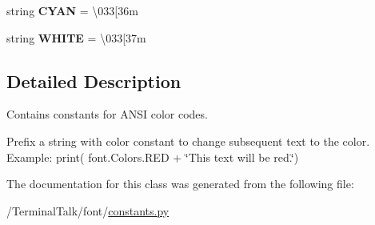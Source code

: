 \begin{DoxyCompactItemize}
\item 
string {\bfseries C\+Y\+AN} = \textquotesingle{}\textbackslash{}033\mbox{[}36m\textquotesingle{}\hypertarget{classfont_1_1constants_1_1Colors_a3d199ec328ec474f2aa6919aed63c9be}{}\label{classfont_1_1constants_1_1Colors_a3d199ec328ec474f2aa6919aed63c9be}

\item 
string {\bfseries W\+H\+I\+TE} = \textquotesingle{}\textbackslash{}033\mbox{[}37m\textquotesingle{}\hypertarget{classfont_1_1constants_1_1Colors_a10f7fbd2ec87e066fe3fba002e2191b6}{}\label{classfont_1_1constants_1_1Colors_a10f7fbd2ec87e066fe3fba002e2191b6}

\end{DoxyCompactItemize}


\subsection{Detailed Description}
Contains constants for A\+N\+SI color codes. 

Prefix a string with color constant to change subsequent text to the color. Example\+: print( font.\+Colors.\+R\+ED + \char`\"{}\+This text will be red.\char`\"{}) 

The documentation for this class was generated from the following file\+:\begin{DoxyCompactItemize}
\item 
/\+Terminal\+Talk/font/\hyperlink{constants_8py}{constants.\+py}\end{DoxyCompactItemize}
